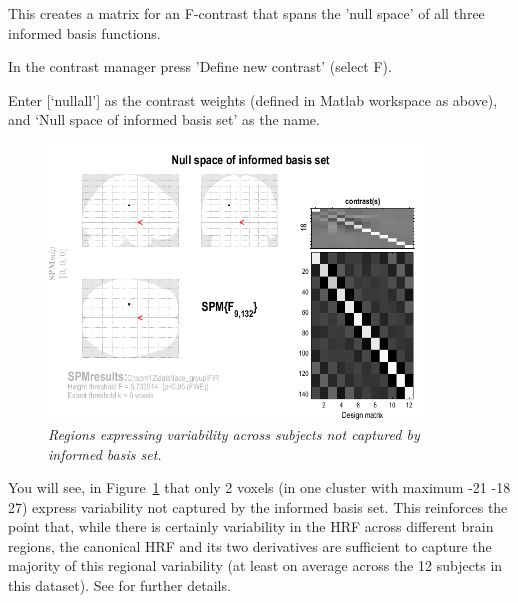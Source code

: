This creates a matrix for an F-contrast that spans the 'null space' of all three informed basis functions.
\bi
\item{In the contrast manager press 'Define new contrast' (select F).}
\item{Enter [`nullall'] as the contrast weights (defined in Matlab workspace
	as above), and `Null space of informed basis set' as the name.}
\ei
\begin{figure}
\begin{center}
\includegraphics[width=100mm]{faces_group/nullall}
\caption{\em Regions expressing variability across subjects not captured by informed basis set. \label{nullall}}
\end{center}
\end{figure}
You will see, in Figure~\ref{nullall} that only 2 voxels (in one cluster with maximum -21 -18 27) express variability not captured by the informed basis set. This reinforces the point that, while there is certainly variability in the HRF across different brain regions, the canonical HRF and its two derivatives are sufficient to capture the majority of this regional variability (at least on average across the 12 subjects in this dataset). See \cite{rnah_basis} for further details.


